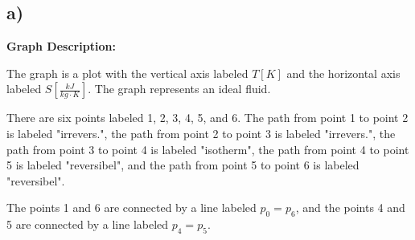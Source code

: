 

\subsection*{a)}

\begin{center}
\textbf{Graph Description:}
\end{center}

The graph is a plot with the vertical axis labeled \( T \left[ K \right] \) and the horizontal axis labeled \( S \left[ \frac{kJ}{kg \cdot K} \right] \). The graph represents an ideal fluid. 

There are six points labeled 1, 2, 3, 4, 5, and 6. The path from point 1 to point 2 is labeled "irrevers.", the path from point 2 to point 3 is labeled "irrevers.", the path from point 3 to point 4 is labeled "isotherm", the path from point 4 to point 5 is labeled "reversibel", and the path from point 5 to point 6 is labeled "reversibel". 

The points 1 and 6 are connected by a line labeled \( p_0 = p_6 \), and the points 4 and 5 are connected by a line labeled \( p_4 = p_5 \).